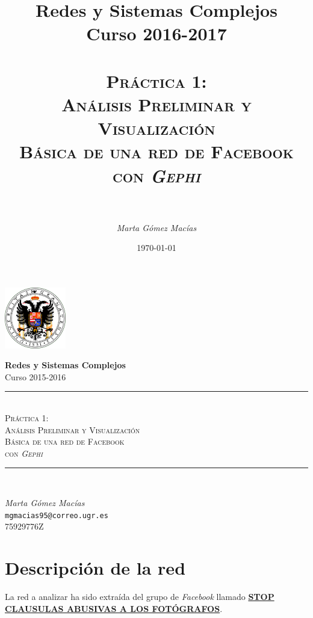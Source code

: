 \documentclass[10pt,a4paper,spanish]{article}
\title{
\normalfont \normalsize 
{\bf Redes y Sistemas Complejos} \\ Curso 2016-2017 \\ [25pt] %
\horrule{0.5pt} \\[0.4cm] %
\huge \textsc{Práctica 1: \\ Análisis Preliminar y Visualización \\ Básica de una red de Facebook \\ con \textit{Gephi}} \\ %
\horrule{2pt} \\[0.5cm] %
}
\author{\textit{Marta Gómez Macías}} %
\numberwithin{equation}{section} %
\numberwithin{figure}{section} %
\numberwithin{table}{section} %
\newcommand{\horrule}[1]{\rule{\linewidth}{#1}} %
\begin{document}
\renewcommand{\listtablename}{Índice de tablas}
\renewcommand{\tablename}{Tabla} 

\begin{titlepage}
\begin{center}
\includegraphics[width=0.2\textwidth]{../../ugr}

\normalfont \normalsize 
{\bf Redes y Sistemas Complejos} \\ Curso 2015-2016 \\ [25pt] %
\horrule{0.5pt} \\[0.4cm] %
{\huge \textsc{Práctica 1: \\ Análisis Preliminar y Visualización \\ Básica de una red de Facebook \\ con \textit{Gephi} \\}} %
\horrule{2pt} \\[0.5cm] %

{\Large \textit{Marta Gómez Macías} \\ \texttt{mgmacias95@correo.ugr.es} \\ 75929776Z \\[0.5cm]

\date{\today}} %
\end{center}
\end{titlepage}

\tableofcontents %



\section{Descripción de la red}

La red a analizar ha sido extraída del grupo de \textit{Facebook} llamado \href{https://www.facebook.com/groups/bastadeabusosconnuestrasfotos/}{\textbf{STOP CLAUSULAS ABUSIVAS A LOS FOTÓGRAFOS}}.

\end{document}
